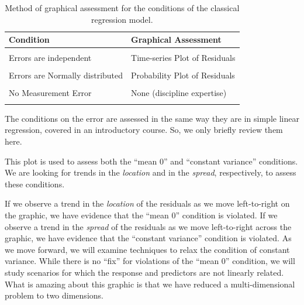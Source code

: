 \documentclass[
  letterpaper,
  DIV=11,
  numbers=noendperiod]{scrreprt}
\theoremstyle{definition}
\theoremstyle{definition}
\theoremstyle{remark}
\begin{document}
\hypertarget{tbl-glm-assessing-conditions-residual-plots}{}
\begin{table}
\caption{\label{tbl-glm-assessing-conditions-residual-plots}Method of graphical assessment for the conditions of the classical
regression model. }\tabularnewline

\centering
\begin{tabular}[t]{ll}
\toprule
Condition & Graphical Assessment\\
\midrule
\cellcolor{gray!6}{Error is 0, on average, for all predictors} & \cellcolor{gray!6}{Residual vs. Predicted Values}\\
Errors are independent & Time-series Plot of Residuals\\
\cellcolor{gray!6}{Homoskedasticity} & \cellcolor{gray!6}{Residual vs. Predicted Values}\\
Errors are Normally distributed & Probability Plot of Residuals\\
\cellcolor{gray!6}{} & \cellcolor{gray!6}{}\\
\addlinespace
No Measurement Error & None (discipline expertise)\\
\cellcolor{gray!6}{Predictor enters linearly} & \cellcolor{gray!6}{Residual vs. Predictor}\\
\bottomrule
\end{tabular}
\end{table}

The conditions on the error are assessed in the same way they are in
simple linear regression, covered in an introductory course. So, we only
briefly review them here.

\begin{tcolorbox}[enhanced jigsaw, bottomrule=.15mm, titlerule=0mm, bottomtitle=1mm, colback=white, coltitle=black, rightrule=.15mm, leftrule=.75mm, toprule=.15mm, toptitle=1mm, left=2mm, opacityback=0, colframe=quarto-callout-note-color-frame, breakable, title=\textcolor{quarto-callout-note-color}{\faInfo}\hspace{0.5em}{Using the Plot of the Residuals vs.~Predicted Values}, arc=.35mm, colbacktitle=quarto-callout-note-color!10!white, opacitybacktitle=0.6]

This plot is used to assess both the ``mean 0'' and ``constant
variance'' conditions. We are looking for trends in the \emph{location}
and in the \emph{spread}, respectively, to assess these conditions.

\end{tcolorbox}

If we observe a trend in the \emph{location} of the residuals as we move
left-to-right on the graphic, we have evidence that the ``mean 0''
condition is violated. If we observe a trend in the \emph{spread} of the
residuals as we move left-to-right across the graphic, we have evidence
that the ``constant variance'' condition is violated. As we move
forward, we will examine techniques to relax the condition of constant
variance. While there is no ``fix'' for violations of the ``mean 0''
condition, we will study scenarios for which the response and predictors
are not linearly related. What is amazing about this graphic is that we
have reduced a multi-dimensional problem to two dimensions.
\end{document}
